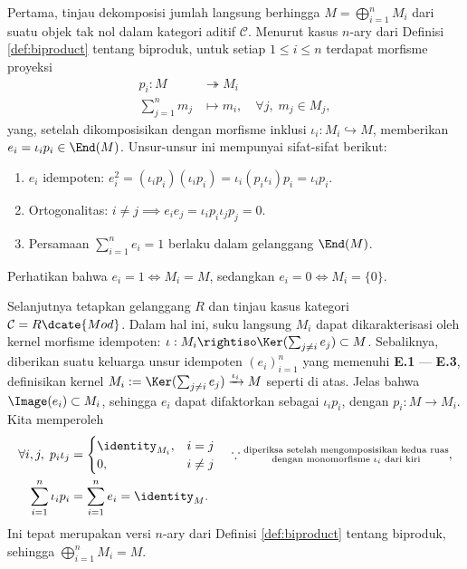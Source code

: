 Pertama, tinjau dekomposisi jumlah langsung berhingga $M = \bigoplus_{i=1}^n M_i$ dari suatu objek tak nol dalam kategori aditif $\mathcal{C}$. Menurut kasus $n$-ary dari Definisi \ref{def:biproduct} tentang biproduk, untuk setiap $1 \leq i \leq n$ terdapat morfisme proyeksi
\begin{align*}
	p_i: M & \twoheadrightarrow M_i \\
	\sum_{j=1}^n m_j & \mapsto m_i, \quad \forall j, \; m_j \in M_j,
\end{align*}
yang, setelah dikomposisikan dengan morfisme inklusi $\iota_i: M_i \hookrightarrow M$, memberikan $e_i = \iota_i p_i \in \End(M)$. Unsur-unsur ini mempunyai sifat-sifat berikut:
\begin{enumerate}[\bfseries {E}.1]
	\item $e_i$ idempoten: $e_i^2 = (\iota_i p_i) (\iota_i p_i) = \iota_i (p_i \iota_i) p_i = \iota_i p_i$.
	\item Ortogonalitas: $i \neq j \implies e_i e_j = \iota_i p_i \iota_j p_j = 0$.
	\item Persamaan $\sum_{i=1}^n e_i = 1$ berlaku dalam gelanggang $\End(M)$.
\end{enumerate}
Perhatikan bahwa $e_i = 1 \iff M_i = M$, sedangkan $e_i = 0 \iff M_i = \{0\}$.

Selanjutnya tetapkan gelanggang $R$ dan tinjau kasus kategori $\mathcal{C} = R\dcate{Mod}$. Dalam hal ini, suku langsung $M_i$ dapat dikarakterisasi oleh kernel morfisme idempoten: $\iota: M_i \rightiso \Ker(\sum_{j \neq i} e_j) \subset M$. Sebaliknya, diberikan suatu keluarga unsur idempoten $(e_i)_{i=1}^n$ yang memenuhi \textbf{E.1} --- \textbf{E.3}, definisikan kernel $M_i := \Ker(\sum_{j \neq i} e_j) \xrightarrow{\iota_i} M$ seperti di atas. Jelas bahwa $\Image(e_i) \subset M_i$, sehingga $e_i$ dapat difaktorkan sebagai $\iota_i p_i$, dengan $p_i: M \to M_i$. Kita memperoleh
\begin{align*}
	\forall i,j, \; p_i \iota_j & = \begin{cases}
		\identity_{M_i}, & i=j \\
		0, & i \neq j
	\end{cases} \quad \because\substack{\text{diperiksa setelah mengomposisikan kedua ruas} \\ \text{dengan monomorfisme }\iota_i\text{ dari kiri}}, \\
	\sum_{i=1}^n \iota_i p_i & = \sum_{i=1}^n e_i = \identity_M.
\end{align*}
Ini tepat merupakan versi $n$-ary dari Definisi \ref{def:biproduct} tentang biproduk, sehingga $\bigoplus_{i=1}^n M_i = M$.

